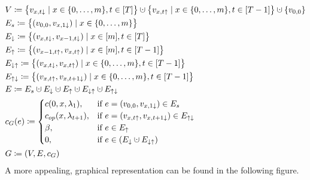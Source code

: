 \begin{align*}
	&V\coloneqq\bigl\{v_{x,t\downarrow}\mid x\in\fromto{0}{m},t\in[T]\bigr\}\dotcup\bigl\{v_{x,t\uparrow}\mid x\in\fromto{0}{m},t\in[T-1]\bigr\}\dotcup\{v_{0,0}\}\\
	&E_s\coloneqq\bigl\{(v_{0,0},v_{x,1\downarrow})\mid x\in\fromto{0}{m}\bigr\}\\
	&E_\downarrow\coloneqq\bigl\{(v_{x,t\downarrow},v_{x-1,t\downarrow})\mid x\in[m],t\in[T]\bigr\}\\
	&E_\uparrow\coloneqq\bigl\{(v_{x-1,t\uparrow},v_{x,t\uparrow})\mid x\in[m],t\in[T-1]\bigr\}\\
	&E_{\downarrow\uparrow}\coloneqq\bigl\{(v_{x,t\downarrow},v_{x,t\uparrow})\mid x\in\fromto{0}{m},t\in[T-1]\bigr\}\\
	&E_{\uparrow\downarrow}\coloneqq\bigl\{(v_{x,t\uparrow},v_{x,t+1\downarrow})\mid x\in\fromto{0}{m},t\in[T-1]\bigr\}\\
	&E\coloneqq E_s\dotcup E_\downarrow\dotcup E_\uparrow\dotcup E_{\downarrow\uparrow}\dotcup E_{\uparrow\downarrow}\\
	&c_G(e)\coloneqq
	\begin{cases}
		\costs(0,x,\lambda_1), & \text{if $e=(v_{0,0},v_{x,1\downarrow})\in E_s$}\\
		\opcosts(x,\lambda_{t+1}), & \text{if $e=(v_{x,t\uparrow},v_{x,t+1\downarrow})\in E_{\uparrow\downarrow}$}\\
		\beta, & \text{if $e\in E_\uparrow$}\\
		0, & \text{if $e\in(E_\downarrow\dotcup E_{\downarrow\uparrow})$}
	\end{cases}\\
	&G\coloneqq(V,E,c_G)
\end{align*}
A more appealing, graphical representation can be found in the following figure.
